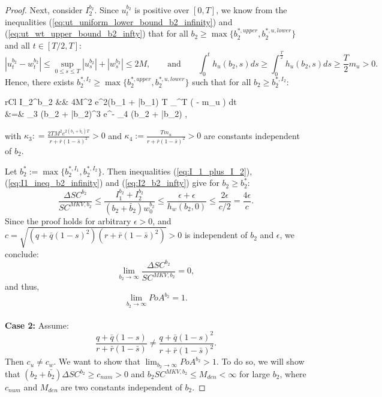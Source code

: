 \documentclass[11pt]{article}
\begin{document}
\begin{proof}
	Next, consider $I_2^{b_2}$. Since $u_t^{b_2}$ is positive over $[0,T]$, we know from the inequalities (\ref{eq:ut_uniform_lower_bound_b2_infinity}) and (\ref{eq:ut_wt_upper_bound_b2_infty}) that for all $b_2 \geq \max\{ b_2^{*,upper}, b_2^{*,u,lower} \}$ and all $t \in [T/2,T]$:
	\begin{equation*}
		\left\vert u_t^{b_2} - w_t^{b_2} \right\vert \leq \sup_{0 \leq s \leq T} \left\vert u_s^{b_2} \right\vert + \left\vert w_s^{b_2} \right\vert  \leq 2M,
		\qquad \text{and} \qquad
		\int_0^{t} h_u(b_2,s) ds \geq \int_0^{\frac{T}{2}} h_u(b_2,s) ds \geq \frac{T}{2} m_u >0.
	\end{equation*}
	Hence, there exists $b_2^{*,I_2} \geq \max \{ b_2^{*,upper}, b_2^{*,u,lower} \}$ such that for all $b_2 \geq b_2^{*,I_2}$:
	\begin{IEEEeqnarray}{rCl}
		I_2^{b_2} &\leq&   \cdot 4M^2 e^{2(b_1 + \bar{b}_1) T} \int_{}^{T} \exp\left( -  \cdot m_u \right) dt \nonumber\\	
		&=& \kappa_3 (b_2 + \bar{b}_2)^3 e^{- \kappa_4 (b_2 + \bar{b}_2)} \leq \epsilon,
	\label{eq:I2_b2_infty}
	\end{IEEEeqnarray}
	with $\kappa_3: = \frac{2 TM^2 e^{2(b_1 + \bar{b}_1) T} }{r + \bar{r}(1-\bar{s})^2} >0$ and $\kappa_4 :=  \frac{T  m_u}{r + \bar{r}(1-\bar{s})^2}>0$ are constants independent of $b_2$. 	
	
	Let $b_2^* := \max \{ b_2^{*,I_1}, b_2^{*,I_2}\}$. Then inequalities (\ref{eq:I_1_plus_I_2}), (\ref{eq:I1_ineq_b2_infinity}) and (\ref{eq:I2_b2_infty}) give for $b_2 \geq b_2^*$:
	\begin{equation*}
		\frac{\Delta SC^{b_2}}{SC^{MKV,b_2}} \leq \frac{I_1^{b_2} + I_2^{b_2}}{(b_2 + \bar{b}_2) w_0^{b_2}} \leq \frac{ \epsilon + \epsilon }{h_w(b_2,0)} \leq \frac{2\epsilon}{c/2}=\frac{4\epsilon}{c}.
	\end{equation*}
	Since the proof holds for arbitrary $\epsilon>0$, and $c=\sqrt{(q+\bar{q}(1-s)^2)(r+\bar{r}(1-\bar{s})^2)}>0$ is independent of $b_2$ and $\epsilon$, we conclude:
	\begin{equation*}
		\lim_{b_2 \to \infty} \frac{\Delta SC^{b_2}}{SC^{MKV,b_2}} = 0, 
	\end{equation*}
	and thus,
	$$ \lim_{b_2 \to \infty} PoA^{b_2} = 1.$$\\
	
	\textbf{Case 2:} Assume:
	\begin{equation*}
	\frac{q+\bar{q}(1-s)}{r+\bar{r}(1-\bar{s})} \neq \frac{q+\bar{q}(1-s)^2}{r+\bar{r}(1-\bar{s})^2}.
	\end{equation*}
	Then $c_u \neq c_w$. We want to show that $\lim_{b_2 \to \infty}PoA^{b_2}>1$. To do so, we will show that $(b_2 + \bar{b_2}) \Delta SC^{b_2}\geq c_{num}>0$ and $b_2 SC^{MKV,b_2} \leq M_{den}<\infty$ for large $b_2$, where $c_{num}$ and $M_{den}$ are two constants independent of $b_2$.
	

\end{proof}
\end{document}
